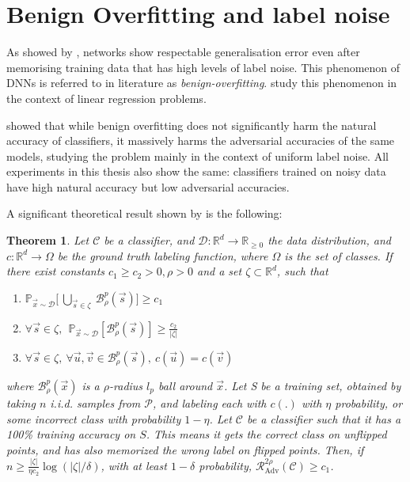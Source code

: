 \documentclass[12pt, oneside]{book}
\newtheorem{theorem}{Theorem}
\begin{document}


\section{Benign Overfitting and label noise}
\label{section:benign}
As showed by \citet{DBLP:journals/cacm/ZhangBHRV21}, networks show respectable
generalisation error even after memorising training data that has high levels of
label noise. This phenomenon of DNNs is referred to in literature as
\emph{benign-overfitting}. \citet{bartlett2020benign} study this phenomenon in
the context of linear regression problems.

\citet{sanyal2021how} showed that while benign overfitting does not
significantly harm the natural accuracy of classifiers, it massively harms the
adversarial accuracies of the same models, studying the problem mainly in the
context of uniform label noise. All experiments in this thesis also show the
same: classifiers trained on noisy data have high natural accuracy but low
adversarial accuracies.

A significant theoretical result shown by \citet{sanyal2021how} is the
following:

\begin{theorem}
    \label{theorem:how-benign-bo}
    Let $\mathcal{C}$ be a classifier, and $\mathcal{D}: \mathbb{R}^d \to
    \mathbb{R}_{\geq 0}$ the data distribution, and $c: \mathbb{R}^d \to \Omega$
    be the ground truth labeling function, where $\Omega$ is the set of classes.
    If there exist constants $c_1 \geq c_2 > 0, \rho > 0$ and a set $\zeta
    \subset \mathbb{R}^d$, such that
    \begin{enumerate}
        \item $\mathbb{P}_{\vec{x} \sim \mathcal{D}} \bigg [~\underset{\vec{s}
        \in \zeta}{\bigcup}~\mathcal{B}_\rho^p(\vec{s}) \bigg ] \geq c_1$
        \item $\forall \vec{s} \in \zeta,~~ \mathbb{P}_{\vec{x} \sim
        \mathcal{D}} [\mathcal{B}_\rho^p(\vec{s})] \geq \frac{c_2}{|\zeta|}$
        \item $\forall \vec{s} \in \zeta,~\forall \vec{u}, \vec{v} \in
        \mathcal{B}_\rho^p(\vec{s}),~c(\vec{u}) = c(\vec{v})$
    \end{enumerate}
    where $\mathcal{B}^p_\rho(\vec{x})$ is a $\rho$-radius $l_p$ ball around
    $\vec{x}$. Let S be a training set, obtained by taking $n$ i.i.d. samples
    from $\mathcal{P}$, and labeling each with $c(.)$ with $\eta$ probability,
    or some incorrect class with probability $1-\eta$. Let $\mathcal{C}$ be a
    classifier such that it has a 100\% training accuracy on $S$. This means it
    gets the correct class on unflipped points, and has also memorized the wrong
    label on flipped points. Then, if $n \geq \frac{|\zeta|}{\eta c_2} \log
    (|\zeta|/\delta)$, with at least $1-\delta$ probability,
    $\mathcal{R}_{\text{Adv}}^{2\rho}(\mathcal{C}) \geq c_1$.
\end{theorem}
\end{document}
